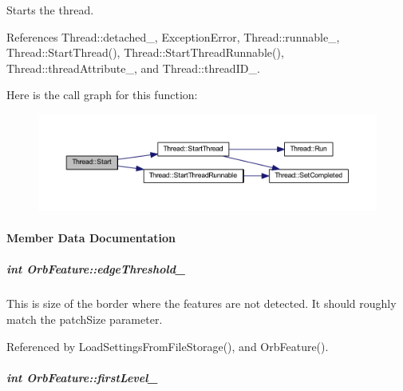 Starts the thread. 



References Thread\-::detached\-\_\-, Exception\-Error, Thread\-::runnable\-\_\-, Thread\-::\-Start\-Thread(), Thread\-::\-Start\-Thread\-Runnable(), Thread\-::thread\-Attribute\-\_\-, and Thread\-::thread\-I\-D\-\_\-.



Here is the call graph for this function\-:
\nopagebreak
\begin{figure}[H]
\begin{center}
\leavevmode
\includegraphics[width=350pt]{group___core_a2b42f82341afd2747ea093b6ac8b91cb_cgraph}
\end{center}
\end{figure}




\paragraph{Member Data Documentation}
\hypertarget{group___feature_extractor_af74609fa7b56d5dea19c9460f42b25ab}{
\subparagraph[{edge\-Threshold\-\_\-}]{\setlength{\rightskip}{0pt plus 5cm}int Orb\-Feature\-::edge\-Threshold\-\_\-\hspace{0.3cm}{\ttfamily [private]}}}\label{group___feature_extractor_af74609fa7b56d5dea19c9460f42b25ab}


This is size of the border where the features are not detected. It should roughly match the patch\-Size parameter. 



Referenced by Load\-Settings\-From\-File\-Storage(), and Orb\-Feature().

\hypertarget{group___feature_extractor_a1c1e186a9f2bc54c38f54f3c1e8f7d0f}{
\subparagraph[{first\-Level\-\_\-}]{\setlength{\rightskip}{0pt plus 5cm}int Orb\-Feature\-::first\-Level\-\_\-\hspace{0.3cm}{\ttfamily [private]}}}\label{group___feature_extractor_a1c1e186a9f2bc54c38f54f3c1e8f7d0f}


